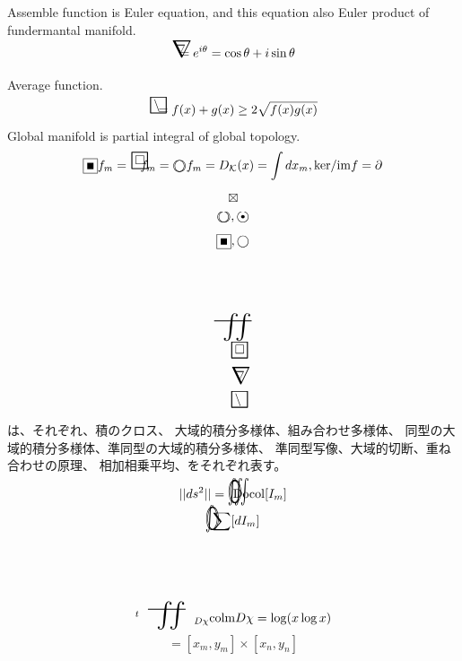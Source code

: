 \documentclass{jsarticle}
\begin{document}
 \newcommand{\whitewithbodercircleiiint}{%
	 \begin{picture}(4,4)
		 \put(0,0){\scalebox{1.0}[2]{$\whitewithbodercircle$}}
		 \put(0,0){\scalebox{1.0}[2]{$\iiint$}}
	 \end{picture}%
	 }
\newcommand{\whitewithbodercircleint}{%
	 \begin{picture}(4,4)
		 \put(0,0){\scalebox{1.0}[2]{$\whitewithbodercircle$}}
		 \put(0,0){\scalebox{1.0}[2]{$\int$}}
	 \end{picture}%
	 }


  \newcommand{\whitewithboder}{%
	  \begin{picture}(5,5)
		  \put(0,0){\scalebox{2.0}[2]{$\square$}}
		  \put(4,4){$\square$}
	  \end{picture}%
  } 
  \newcommand{\whitewithnabla}{%
	  \begin{picture}(4,4)
		  \put(0,0){\scalebox{2.0}[2]{$\nabla$}}
		  \put(3,3){$\nabla$}
	  \end{picture}%
  } 
  \newcommand{\average}{%
	  \begin{picture}(5,5)
		  \put(0,0){\scalebox{2.0}[2]{$\square$}}
		  \put(4,4){$\setminus$}
	  \end{picture}%
  } 
 

  Assemble function is Euler equation, and this equation also
  Euler product of fundermantal manifold.
  $$ \whitewithnabla = e^{i\theta} = \cos \theta + i \sin \theta $$

  Average function.
  $$ \average = {{f(x) + g(x)}} \ge 2{\sqrt{f(x)g(x)}} $$
  Global manifold is partial integral of global topology.
 $$ \whitewithblacksquare f_m =  \whitewithboder \text{                 
      } f_m = 
 \whitewithbodercircle f_m = 
  D_{\mathcal{K}}(x) = \int dx_m , \mathrm{ker}/\mathrm{im}f = 
  \partial $$

$$\boxtimes$$
$$\whitewithbodercircle, \whitewithblack $$
$$\whitewithblacksquare,\whitewithwhitecircle$$
$$\scalebox{2.0}[2]{\variint}$$ 
$$\whitewithboder$$ 
$$ \whitewithnabla$$
$$\average$$ 
は、それぞれ、積のクロス、 大域的積分多様体、組み合わせ多様体、
同型の大域的積分多様体、準同型の大域的積分多様体、
準同型写像、大域的切断、重ね合わせの原理、
相加相乗平均、をそれぞれ表す。
 

$$||ds^2||=\whitewithbodercircleiiint \mathrm{Docol}[I_m]$$
$$  \whitewithbodercircleint \sum[dI_m]$$

$$ {}^t\scalebox{2.0}[2]{\variint}_{D\chi}\mathrm{colm}D\chi = \log(x\log x)$$
$$ = [x_m,y_m]\times [x_n,y_n] $$
\end{document}
